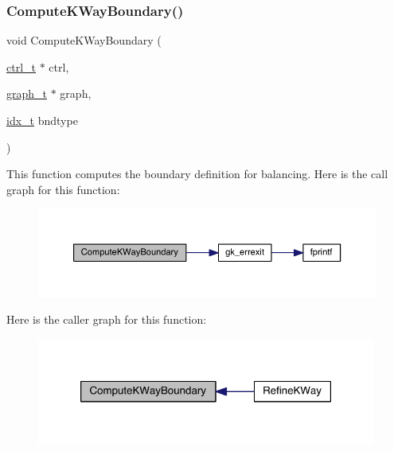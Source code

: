 \subsubsection{\texorpdfstring{Compute\+K\+Way\+Boundary()}{ComputeKWayBoundary()}}
{\footnotesize\ttfamily void Compute\+K\+Way\+Boundary (\begin{DoxyParamCaption}\item[{\hyperlink{a00742}{ctrl\+\_\+t} $\ast$}]{ctrl,  }\item[{\hyperlink{a00734}{graph\+\_\+t} $\ast$}]{graph,  }\item[{\hyperlink{a00876_aaa5262be3e700770163401acb0150f52}{idx\+\_\+t}}]{bndtype }\end{DoxyParamCaption})}

This function computes the boundary definition for balancing. Here is the call graph for this function\+:\nopagebreak
\begin{figure}[H]
\begin{center}
\leavevmode
\includegraphics[width=350pt]{a00915_aa23b4d433fc175282f237653d3edb8a5_cgraph}
\end{center}
\end{figure}
Here is the caller graph for this function\+:\nopagebreak
\begin{figure}[H]
\begin{center}
\leavevmode
\includegraphics[width=316pt]{a00915_aa23b4d433fc175282f237653d3edb8a5_icgraph}
\end{center}
\end{figure}
\mbox{\label{a00915_afd723ab2f44ffaa25d1d9f1909e06dfd}} 
